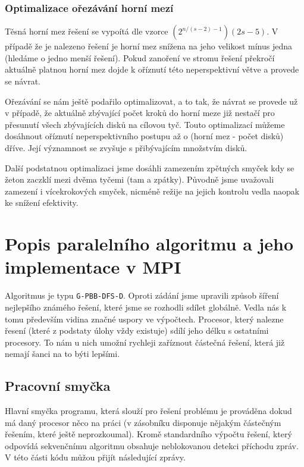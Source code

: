 \documentclass[12pt]{article}
\begin{document}
\subsubsection{Optimalizace ořezávání horní mezí}
Těsná horní mez řešení se vypoítá dle vzorce $(2^{n/(s-2)-1})(2s-5)$. V případě
že je nalezeno řešení je horní mez snížena na jeho velikost mínus jedna (hledáme
o jedno menší řešení). Pokud zanoření ve stromu řešení překročí aktuálně platnou
horní mez dojde k oříznutí této neperspektivní větve a provede se návrat. 

Ořezávání se nám ještě podařilo optimalizovat, a to tak, že návrat se provede už
v případě, že aktuálně zbývající počet kroků do horní meze již nestačí pro
přesunutí všech zbývajících disků na cílovou tyč. Touto optimalizací můžeme
dosáhnout oříznutí neperspektivního postupu až o (horní mez - počet disků)
dříve. Její významnost se zvyšuje s přibývajícím množstvím disků.

Další podstatnou optimalizaci jsme dosáhli zamezením zpětných smyček kdy se
žeton zaczklí mezi dvěma tyčemi (tam a zpátky). Původně jsme uvažovali zamezení
i vícekrokových smyček, nicméně režije na jejich kontrolu vedla naopak ke
snížení efektivity.

\section{Popis paralelního algoritmu a jeho implementace v MPI}
Algoritmus je typu \verb|G-PBB-DFS-D|. Oproti zádání jsme upravili způsob
šíření nejlepšího známého řešení, které jsme se rozhodli sdílet globálně. Vedla
nás k tomu především vidina značné uspory ve výpočtech. Procesor, který nalezne
řesení (které z podstaty úlohy vždy existuje) sdílí jeho délku s ostatními
procesory. To nám u nich umožní rychleji zaříznout částečná řešení, která již
nemají šanci na to býti lepšími.

\subsection{Pracovní smyčka}
Hlavní smyčka programu, která slouží pro řešení problému je prováděna dokud má
daný procesor něco na práci (v zásobníku disponuje nějakým částečným řešením,
které ještě neprozkoumal). Kromě standardního výpočtu řešení, který odpovídá
sekvenčnímu algoritmu obsahuje neblokovanou detekci příchodu zpráv. V této
části kódu můžou přijít následující zprávy.
\end{document}
